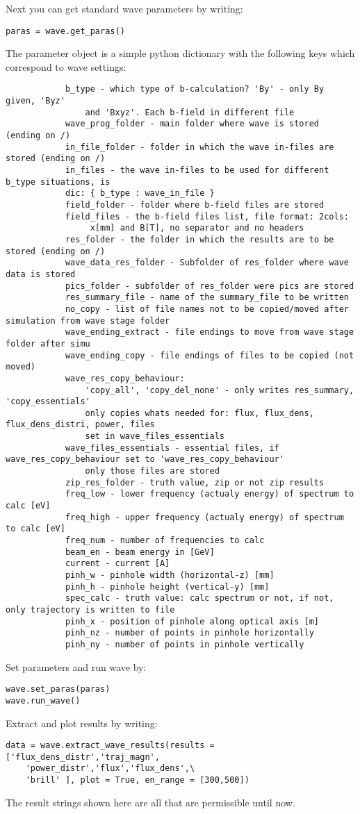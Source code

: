 \documentclass[
12pt,%
a4paper,  %
twoside        %
]{report}
\begin{document}
Next you can get standard wave parameters by writing:
\begin{verbatim}
paras = wave.get_paras()
\end{verbatim}
\clearpage
\begin{landscape}
The parameter object is a simple python dictionary with the following keys which correspond to wave settings:
\begin{verbatim}
			b_type - which type of b-calculation? 'By' - only By given, 'Byz'
				and 'Bxyz'. Each b-field in different file
			wave_prog_folder - main folder where wave is stored (ending on /)
			in_file_folder - folder in which the wave in-files are stored (ending on /)
			in_files - the wave in-files to be used for different b_type situations, is 
			dic: { b_type : wave_in_file }	
			field_folder - folder where b-field files are stored
			field_files - the b-field files list, file format: 2cols:
				 x[mm] and B[T], no separator and no headers
			res_folder - the folder in which the results are to be stored (ending on /)
			wave_data_res_folder - Subfolder of res_folder where wave data is stored
			pics_folder - subfolder of res_folder were pics are stored
			res_summary_file - name of the summary_file to be written
			no_copy - list of file names not to be copied/moved after simulation from wave stage folder
			wave_ending_extract - file endings to move from wave stage folder after simu
			wave_ending_copy - file endings of files to be copied (not moved)
			wave_res_copy_behaviour:
				'copy_all', 'copy_del_none' - only writes res_summary, 'copy_essentials' 
				only copies whats needed for: flux, flux_dens, flux_dens_distri, power, files 
				set in wave_files_essentials
			wave_files_essentials - essential files, if wave_res_copy_behaviour set to 'wave_res_copy_behaviour' 
				only those files are stored
			zip_res_folder - truth value, zip or not zip results
			freq_low - lower frequency (actualy energy) of spectrum to calc [eV]
			freq_high - upper frequency (actualy energy) of spectrum to calc [eV]
			freq_num - number of frequencies to calc
			beam_en - beam energy in [GeV]
			current - current [A]
			pinh_w - pinhole width (horizontal-z) [mm]
			pinh_h - pinhole height (vertical-y) [mm]
			spec_calc - truth value: calc spectrum or not, if not, only trajectory is written to file
			pinh_x - position of pinhole along optical axis [m]
			pinh_nz - number of points in pinhole horizontally
			pinh_ny - number of points in pinhole vertically
\end{verbatim}
\end{landscape}
Set parameters and run wave by:
\begin{verbatim}
wave.set_paras(paras)
wave.run_wave()
\end{verbatim}
Extract and plot results by writing:
\begin{verbatim}
data = wave.extract_wave_results(results = ['flux_dens_distr','traj_magn',
	'power_distr','flux','flux_dens',\
 	'brill' ], plot = True, en_range = [300,500])
\end{verbatim}
The result strings shown here are all that are permissible until now.
\end{document}
